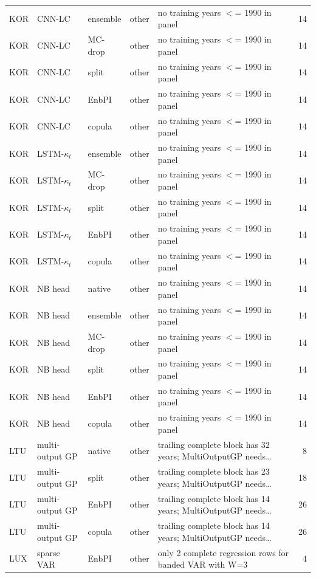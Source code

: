 {\begin{longtable}{@{}lllp{1.6cm}p{6.2cm}r@{}}
KOR & CNN-LC & ensemble & other & no training years $<$= 1990 in panel & 14 \\
KOR & CNN-LC & MC-drop & other & no training years $<$= 1990 in panel & 14 \\
KOR & CNN-LC & split & other & no training years $<$= 1990 in panel & 14 \\
KOR & CNN-LC & EnbPI & other & no training years $<$= 1990 in panel & 14 \\
KOR & CNN-LC & copula & other & no training years $<$= 1990 in panel & 14 \\
KOR & LSTM-$\kappa_t$ & ensemble & other & no training years $<$= 1990 in panel & 14 \\
KOR & LSTM-$\kappa_t$ & MC-drop & other & no training years $<$= 1990 in panel & 14 \\
KOR & LSTM-$\kappa_t$ & split & other & no training years $<$= 1990 in panel & 14 \\
KOR & LSTM-$\kappa_t$ & EnbPI & other & no training years $<$= 1990 in panel & 14 \\
KOR & LSTM-$\kappa_t$ & copula & other & no training years $<$= 1990 in panel & 14 \\
KOR & NB head & native & other & no training years $<$= 1990 in panel & 14 \\
KOR & NB head & ensemble & other & no training years $<$= 1990 in panel & 14 \\
KOR & NB head & MC-drop & other & no training years $<$= 1990 in panel & 14 \\
KOR & NB head & split & other & no training years $<$= 1990 in panel & 14 \\
KOR & NB head & EnbPI & other & no training years $<$= 1990 in panel & 14 \\
KOR & NB head & copula & other & no training years $<$= 1990 in panel & 14 \\
LTU & multi-output GP & native & other & trailing complete block has 32 years; MultiOutputGP needs\ldots & 8 \\
LTU & multi-output GP & split & other & trailing complete block has 23 years; MultiOutputGP needs\ldots & 18 \\
LTU & multi-output GP & EnbPI & other & trailing complete block has 14 years; MultiOutputGP needs\ldots & 26 \\
LTU & multi-output GP & copula & other & trailing complete block has 14 years; MultiOutputGP needs\ldots & 26 \\
LUX & sparse VAR & EnbPI & other & only 2 complete regression rows for banded VAR with W=3 & 4 \\

\end{longtable}}
